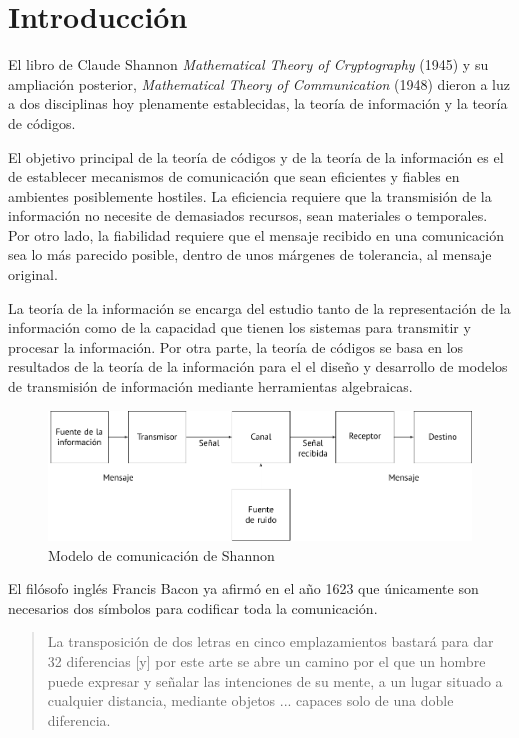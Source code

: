 \chapter*{Introducción}
 
El libro de Claude Shannon \textit{Mathematical Theory of Cryptography} (1945) y su ampliación posterior, \textit{Mathematical Theory of Communication} (1948) dieron a luz a dos disciplinas hoy plenamente establecidas, la teoría de información y la teoría de códigos.

El objetivo principal de la teoría de códigos y de la teoría de la información es el de establecer mecanismos de comunicación que sean eficientes y fiables en ambientes posiblemente hostiles.
La eficiencia requiere que la transmisión de la información no necesite de demasiados recursos, sean materiales o temporales.
Por otro lado, la fiabilidad requiere que el mensaje recibido en una comunicación sea lo más parecido posible, dentro de unos márgenes de tolerancia, al mensaje original.

La teoría de la información se encarga del estudio tanto de la representación de la información como de la capacidad que tienen los sistemas para transmitir y procesar la información. 
Por otra parte, la teoría de códigos se basa en los resultados de la teoría de la información para el el diseño y desarrollo de modelos de transmisión de información mediante herramientas algebraicas.

\begin{figure}
  \includegraphics[width=\textwidth]{assets/shannon-communication-model.pdf}
  \caption*{Modelo de comunicación de Shannon}
\end{figure}

El filósofo inglés Francis Bacon ya afirmó en el año 1623 que únicamente son necesarios dos símbolos para codificar toda la comunicación.

\blockquote[{\cite[30]{dyson_catedral_2015}}]{La transposición de dos letras en cinco emplazamientos bastará para dar 32 diferencias [y] por este arte se abre un camino por el que un hombre puede expresar y señalar las intenciones de su mente, a un lugar situado a cualquier distancia, mediante objetos ... capaces solo de una doble diferencia.}
